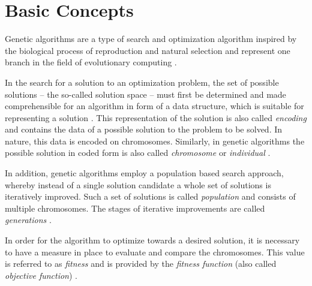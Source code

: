 \documentclass[sigconf]{acmart}
\begin{document}


\section{Basic Concepts}
Genetic algorithms are a type of search and optimization algorithm inspired
by the biological process of reproduction and natural selection and represent
one branch in the field of evolutionary computing \cite{goldberg1989, Carr2014}.

In the search for a solution to an optimization problem, the set of possible
solutions -- the so-called solution space -- must first be determined and made
comprehensible for an algorithm in form of a data structure, which is suitable
for representing a solution \cite{Affenzeller2009}.
This representation of the solution is also called \textit{encoding} and
contains the data of a possible solution to the problem to be solved.
In nature, this data is encoded on chromosomes. Similarly, in genetic algorithms
the possible solution in coded form is also called \textit{chromosome} or
\textit{individual} \cite{Affenzeller2009}.

In addition, genetic algorithms employ a population based search approach,
whereby instead of a single solution candidate a whole set of solutions is
iteratively improved. Such a set of solutions is called \textit{population}
and consists of multiple chromosomes. The stages of iterative improvements
are called \textit{generations} \cite{Affenzeller2009}.

In order for the algorithm to optimize towards a desired solution, it is
necessary to have a measure in place to evaluate and compare the chromosomes.
This value is referred to as \textit{fitness} and is provided by the
\textit{fitness function} (also called \textit{objective function})
\cite{Affenzeller2009}.
\end{document}
